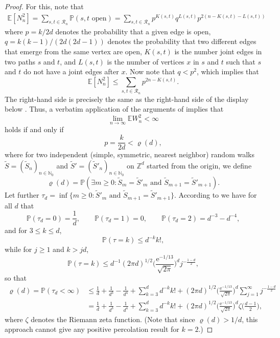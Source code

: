 \documentclass{article}
\newcommand{\e}{\mathrm e}
\newcommand{\N}{\mathbb{N}}
\theoremstyle{definition}
\renewcommand{\P}{\mathbb{P}}
\newcommand{\1}{\mathbbm{1}}
\newcommand{\E}{\mathbb{E}}
\newcommand{\0}{\mathbf{o}}
\newcommand{\Z}{\mathbb{Z}}
\begin{document}
\begin{proof}
For this, note that 
\begin{align*}
\E[N_n^2]=\sum_{s,t\in \mathcal R_n}\P(s,t\text{ open})=\sum_{s,t\in \mathcal R_n}p^{K(s,t)}q^{L(s,t)}p^{2(n-K(s,t)-L(s,t))}
\end{align*}
where $p=k/2d$ denotes the probability that a given edge is open, $q=k(k-1)/(2d(2d-1))$ denotes the probability that two different edges that emerge from the same vertex are open, $K(s,t)$ is the number joint edges in two paths $s$ and $t$, and $L(s,t)$ is the number of vertices $x$ in $s$ and $t$ such that $s$ and $t$ do not have a joint edges after $x$.  Now note that $q<p^2$, which implies that
\[ \E[N_n^2] \leq \sum_{s,t\in \mathcal R_n} p^{2n-K(s,t)}. \]
The right-hand side is precisely the same as the right-hand side of the display below \cite[Equation~(2$\cdot$7)]{CoxDurrett}. Thus, a verbatim application of the arguments of \cite[Section 2]{CoxDurrett} implies that 
\[ \lim_{n\to\infty} \E W_n^2 <\infty \]
holds if and only if 
\[ p = \frac{k}{2d} < \varrho(d), \]
where for two independent (simple, symmetric, nearest neighbor) random walks $\widetilde S=(\widetilde S_n)_{n\in\N_0}$ and $\widetilde S'=(\widetilde S'_n)_{n\in\N_0}$ on $\Z^d$ started from the origin, we define
\[ \varrho(d) = \P(\exists m\geq 0 \colon \widetilde S_m = \widetilde S'_m \text{ and } \widetilde S_{m+1} = \widetilde S'_{m+1}). \]
Let further $\tau_d=\inf \{ m \geq 0 \colon \widetilde S'_m \text{ and } \widetilde S_{m+1} = \widetilde S'_{m+1} \}$.
According to \cite[p.~155]{CoxDurrett} we have for all $d$ that
\begin{equation}\label{firstfew} \P(\tau_d=0)=\frac{1}{d}, \qquad \P(\tau_d=1)=0, \qquad \P(\tau_d=2)=d^{-3}-d^{-4}, \end{equation}
and for $3 \leq k \leq d$,
\[ \P(\tau=k) \leq d^{-k} k!, \]
while for $j\geq 1$ and $k >jd$,
\begin{equation}\label{bigk} \P(\tau=k) \leq d^{-1} (2\pi d)^{1/2} \Big( \frac{\e^{-1/13}}{\sqrt{2\pi}} \Big)^d j^{-\frac{1-d}{2}}, \end{equation}
so that
\begin{equation}\label{CDUB} \begin{aligned} \varrho(d)=\P(\tau_d<\infty) &\leq \frac{1}{d} + \frac{1}{d^3} -\frac{1}{d^4} + \sum_{k=3}^d d^{-k} k! +  (2\pi d)^{1/2} \Big( \frac{\e^{-1/13}}{\sqrt{2\pi}} \Big)^d \sum_{j=1}^{\infty} j^{-\frac{1-d}{2}} \\ & = \frac{1}{d} + \frac{1}{d^3} -\frac{1}{d^4} + \sum_{k=3}^d d^{-k} k! +  (2\pi d)^{1/2} \Big( \frac{\e^{-1/13}}{\sqrt{2\pi}} \Big)^d \zeta\Big( \frac{d-1}{2} \Big), \end{aligned} \end{equation}
where $\zeta$ denotes the Riemann zeta function. (Note that since $\varrho(d)>1/d$, this approach cannot give any positive percolation result for $k=2$.)


\end{proof}
\end{document}
